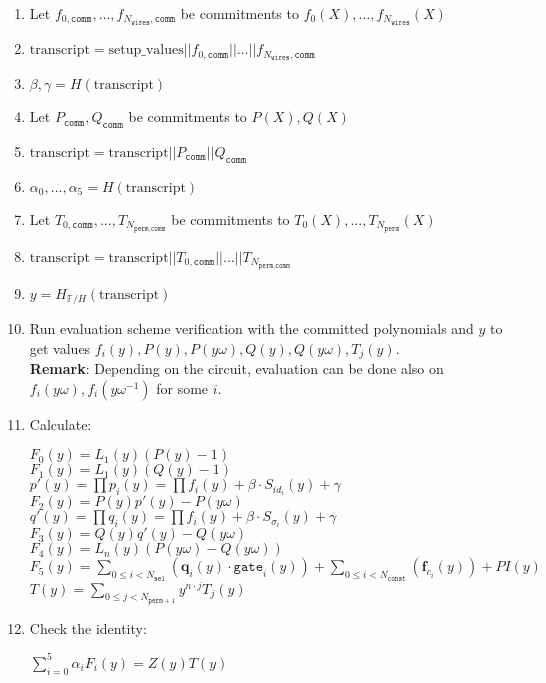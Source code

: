 \begin{enumerate}
	\item Let $f_{0, \texttt{comm}}, \dots, f_{N_{\texttt{wires}}, \texttt{comm}}$ be commitments to $f_{0}(X), \dots, f_{N_{\texttt{wires}}}(X)$
	\item $\text{transcript} = \text{setup\_values} || f_{0, \texttt{comm}} || \dots || f_{N_{\texttt{wires}}, \texttt{comm}}$
	\item $\beta, \gamma = H(\text{transcript})$
	\item Let $P_{\texttt{comm}}, Q_{\texttt{comm}}$ be commitments to $P(X), Q(X)$
	\item $\text{transcript} = \text{transcript} || P_{\texttt{comm}} || Q_{\texttt{comm}}$
	\item $\alpha_0, \dots, \alpha_5 = H(\text{transcript})$
	\item Let $T_{0, \texttt{comm}}, ..., T_{N_{\texttt{perm}, \texttt{comm}}}$ be commitments to $T_0(X), ..., T_{N_{\texttt{perm}}}(X)$ 
	\item $\text{transcript} = \text{transcript} || T_{0, \texttt{comm}} || ... || T_{N_{\texttt{perm}, \texttt{comm}}}$
	\item $y = H_{\mathbb{F}/H}(\text{transcript})$
	\item Run evaluation scheme verification with the committed polynomials and $y$ to get values 
		$f_i(y), P(y), P(y\omega), Q(y), Q(y\omega), T_j(y)$.  \\
		\textbf{Remark}: Depending on the circuit, evaluation can be done also on $f_i(y\omega), f_i(y\omega^{-1})$ for some $i$.
	\item Calculate:
	\begin{center}
		$F_0(y) = L_1(y)(P(y) - 1)$ \\
		$F_1(y) = L_1(y)(Q(y) - 1)$ \\
		$p'(y) = \prod p_i(y) = \prod f_i(y) + \beta \cdot S_{id_i}(y) + \gamma$ \\
		$F_2(y) = P(y)p'(y) - P(y\omega)$ \\
		$q'(y) = \prod q_i(y) = \prod f_i(y) + \beta \cdot S_{\sigma_i}(y) + \gamma$ \\
		$F_3(y) = Q(y)q'(y) - Q(y\omega)$ \\
		$F_4(y) = L_n(y)(P(y\omega) - Q(y\omega))$ \\
		$F_5(y) = \sum\limits_{0 \leq i < N_{\texttt{sel}}} (\textbf{q}_{i}(y) \cdot \texttt{gate}_i(y))
			+ \sum\limits_{0 \leq i < N_{\texttt{const}}}(\textbf{f}_{c_i}(y)) + PI(y)$ \\
		$T(y) = \sum\limits_{0 \leq j < N_{\texttt{perm} + 1}}y^{n \cdot j}T_j(y)$
	\end{center}
	\item Check the identity:
	\begin{center}
		$\sum\limits_{i = 0}^5\alpha_iF_i(y) = Z(y)T(y)$
	\end{center}
\end{enumerate}